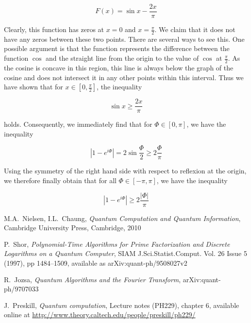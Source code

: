 \documentclass[a4paper, draft]{article}
\theoremstyle{own}
\theoremstyle{remark}
\begin{document}
$$
F(x) = \sin x - \frac{2x}{\pi}
$$

Clearly, this function has zeros at $x = 0$ and $x = \frac{\pi}{2}$. We claim that it does not have any zeros between these two points. There are several ways to see this. One possible argument is that the function represents the difference between the function $\cos $ and the straight line from the origin to the value of $\cos$ at $\frac{\pi}{2}$. As the cosine is concave in this region, this line is always below the graph of the cosine and does not intersect it in any other points within this interval. Thus we have shown that for $x \in [0,\frac{\pi}{2}]$, the inequality

$$
\sin x \geq \frac{2x}{\pi}
$$

holds. Consequently, we immediately find that for $\Phi \in [0,\pi]$, we have the inequality

$$
| 1- e^{i\Phi}| = 2 \sin \frac{\Phi}{2}  \geq 2 \frac{\Phi}{\pi}
$$

Using the symmetry of the right hand side with respect to reflexion at the origin, we therefore finally obtain that for all $\Phi \in [-\pi, \pi]$, we have the inequality

$$
| 1- e^{i\Phi}|   \geq 2 \frac{|\Phi|}{\pi}
$$




\begin{thebibliography}{9}


M.A.~Nielsen, I.L.~Chaung, \emph{Quantum Computation and Quantum Information},
Cambridge University Press, Cambridge, 2010

P.~Shor, \emph{Polynomial-Time Algorithms for Prime Factorization and Discrete Logarithms on a Quantum Computer}, SIAM J.Sci.Statist.Comput. Vol. 26 Issue 5 (1997), pp 1484--1509, available as arXiv:quant-ph/9508027v2


R.~Jozsa, \emph{Quantum Algorithms and the Fourier Transform},  	arXiv:quant-ph/9707033

J.~Preskill, \emph{Quantum computation}, Lecture notes (PH229), chapter 6, available online at \url{http://www.theory.caltech.edu/people/preskill/ph229/}



\end{thebibliography}
\end{document}
